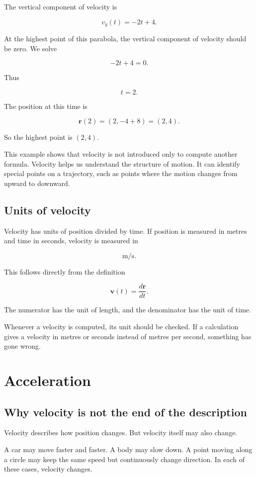 The vertical component of velocity is

\[
v_y(t)=-2t+4.
\]

At the highest point of this parabola, the vertical component of velocity should be zero. We solve

\[
-2t+4=0.
\]

Thus

\[
t=2.
\]

The position at this time is

\[
\mathbf{r}(2)=(2,-4+8)=(2,4).
\]

So the highest point is \((2,4)\).

This example shows that velocity is not introduced only to compute another formula. Velocity helps us understand the structure of motion. It can identify special points on a trajectory, such as points where the motion changes from upward to downward.

\subsection{Units of velocity}

Velocity has units of position divided by time. If position is measured in metres and time in seconds, velocity is measured in

\[
\mathrm{m/s}.
\]

This follows directly from the definition

\[
\mathbf{v}(t)=\frac{d\mathbf{r}}{dt}.
\]

The numerator has the unit of length, and the denominator has the unit of time.

Whenever a velocity is computed, its unit should be checked. If a calculation gives a velocity in metres or seconds instead of metres per second, something has gone wrong.

\section{Acceleration}

\subsection{Why velocity is not the end of the description}

Velocity describes how position changes. But velocity itself may also change.

A car may move faster and faster. A body may slow down. A point moving along a circle may keep the same speed but continuously change direction. In each of these cases, velocity changes.

